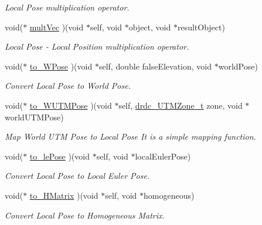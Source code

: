 \begin{CompactItemize}
\begin{CompactList}\small\item\em Local Pose multiplication operator. \item\end{CompactList}\item 
void($\ast$ \hyperlink{structdrdc__lPose__t_a745ee51417233f421a1b7070d07aa47}{multVec} )(void $\ast$self, void $\ast$object, void $\ast$resultObject)
\begin{CompactList}\small\item\em Local Pose - Local Position multiplication operator. \item\end{CompactList}\item 
void($\ast$ \hyperlink{structdrdc__lPose__t_2f2d7db92fa938afae79e7068b5eded6}{to\_\-WPose} )(void $\ast$self, double falseElevation, void $\ast$worldPose)
\begin{CompactList}\small\item\em Convert Local Pose to World Pose. \item\end{CompactList}\item 
void($\ast$ \hyperlink{structdrdc__lPose__t_380cbf9027e090e6e630130be267726e}{to\_\-WUTMPose} )(void $\ast$self, \hyperlink{structdrdc__UTMZone__t}{drdc\_\-UTMZone\_\-t} zone, void $\ast$worldUTMPose)
\begin{CompactList}\small\item\em Map World UTM Pose to Local Pose It is a simple mapping function. \item\end{CompactList}\item 
void($\ast$ \hyperlink{structdrdc__lPose__t_78f7d7124384ad525040834608a80e7b}{to\_\-lePose} )(void $\ast$self, void $\ast$localEulerPose)
\begin{CompactList}\small\item\em Convert Local Pose to Local Euler Pose. \item\end{CompactList}\item 
void($\ast$ \hyperlink{structdrdc__lPose__t_8edc1a2e055fc2c8d4bdd1fdc95ed531}{to\_\-HMatrix} )(void $\ast$self, void $\ast$homogeneous)
\begin{CompactList}\small\item\em Convert Local Pose to Homogeneous Matrix. \item\end{CompactList}\end{CompactItemize}


